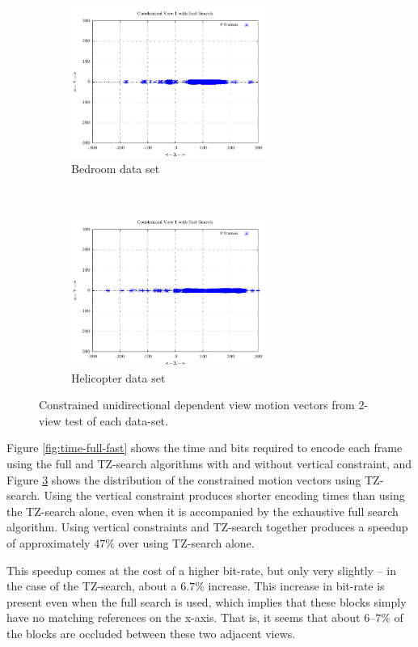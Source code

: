 \documentclass{sig-alternate-05-2015}
\begin{document}
\begin{figure}[h]
\centering
\begin{subfigure}{.5\textwidth}
\centering
\includegraphics[width=2.5in]{figures/bedroom1-inter-view-constrained-mvs.pdf}
\caption{Bedroom data set}
\label{fig:bedroom-inter-view-constrained-mvs}
\end{subfigure} \\
\begin{subfigure}{.5\textwidth}
\centering
\includegraphics[width=2.5in]{figures/helicopter-inter-view-constrained-mvs.pdf}
\caption{Helicopter data set}
\label{fig:helicopter-inter-view-constrained-mvs}
\end{subfigure}
\caption{Constrained unidirectional dependent view motion vectors from 2-view
test of each data-set.}
\label{fig:inter-view-constrained-mvs}
\end{figure}

Figure \ref{fig:time-full-fast} shows the time and bits required to encode each
frame using the full and TZ-search algorithms with and without vertical
constraint, and Figure \ref{fig:inter-view-constrained-mvs} shows the
distribution of the constrained motion vectors using TZ-search. Using the
vertical constraint produces shorter encoding times than using the TZ-search
alone, even when it is accompanied by the exhaustive full search algorithm.
Using vertical constraints and TZ-search together produces a speedup of
approximately $47\%$ over using TZ-search alone.

This speedup comes at the cost of a higher bit-rate, but only very slightly
-- in the case of the TZ-search, about a $6.7\%$ increase. This increase in
bit-rate is present even when the full search is used, which implies that these
blocks simply have no matching references on the x-axis. That is, it seems that
about $6$--$7\%$ of the blocks are occluded between these two adjacent views.
\end{document}
